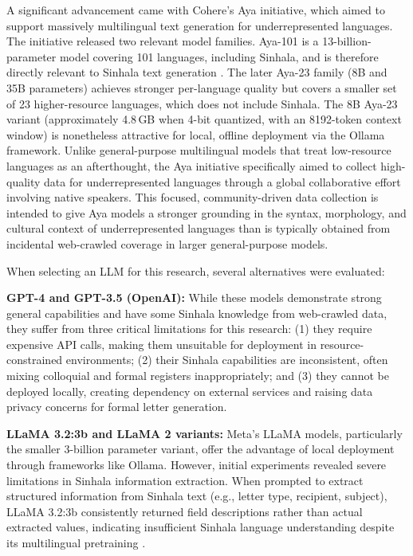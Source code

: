 \documentclass[12pt]{uomthesis}
\begin{document}
A significant advancement came with Cohere's Aya initiative, which aimed to support massively multilingual text generation for underrepresented languages. The initiative released two relevant model families. Aya-101 is a 13-billion-parameter model covering 101 languages, including Sinhala, and is therefore directly relevant to Sinhala text generation \cite{31}. The later Aya-23 family (8B and 35B parameters) achieves stronger per-language quality but covers a smaller set of 23 higher-resource languages, which does not include Sinhala. The 8B Aya-23 variant (approximately 4.8\,GB when 4-bit quantized, with an 8192-token context window) is nonetheless attractive for local, offline deployment via the Ollama framework. Unlike general-purpose multilingual models that treat low-resource languages as an afterthought, the Aya initiative specifically aimed to collect high-quality data for underrepresented languages through a global collaborative effort involving native speakers. This focused, community-driven data collection is intended to give Aya models a stronger grounding in the syntax, morphology, and cultural context of underrepresented languages than is typically obtained from incidental web-crawled coverage in larger general-purpose models.

When selecting an LLM for this research, several alternatives were evaluated:

\textbf{GPT-4 and GPT-3.5 (OpenAI):} While these models demonstrate strong general capabilities and have some Sinhala knowledge from web-crawled data, they suffer from three critical limitations for this research: (1) they require expensive API calls, making them unsuitable for deployment in resource-constrained environments; (2) their Sinhala capabilities are inconsistent, often mixing colloquial and formal registers inappropriately; and (3) they cannot be deployed locally, creating dependency on external services and raising data privacy concerns for formal letter generation.

\textbf{LLaMA 3.2:3b and LLaMA 2 variants:} Meta's LLaMA models, particularly the smaller 3-billion parameter variant, offer the advantage of local deployment through frameworks like Ollama. However, initial experiments revealed severe limitations in Sinhala information extraction. When prompted to extract structured information from Sinhala text (e.g., letter type, recipient, subject), LLaMA 3.2:3b consistently returned field descriptions rather than actual extracted values, indicating insufficient Sinhala language understanding despite its multilingual pretraining \cite{32}.
\end{document}

